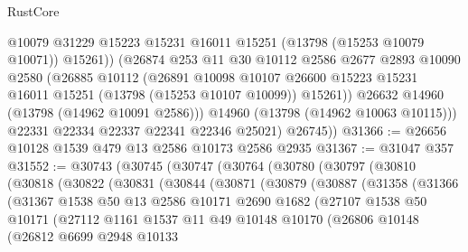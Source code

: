 \begin{lexlean}{RustCore}
\begin{coremodule}
                @10079
                @31229
                @15223
                @15231
                @16011
                @15251
                (@13798 (@15253 @10079 @10071))
                @15261))
            (@26874
              @253
              @11
              @30
              @10112
              @2586
              @2677
              @2893
              @10090
              @2580
              (@26885
                @10112
                (@26891
                  @10098
                  @10107
                  @26600
                  @15223
                  @15231
                  @16011
                  @15251
                  (@13798 (@15253 @10107 @10099))
                  @15261))
              @26632
              @14960
              (@13798 (@14962 @10091 @2586)))
            @14960
            (@13798 (@14962 @10063 @10115)))
          @22331
          @22334
          @22337
          @22341
          @22346
          @25021)
        @26745))
@31366 := @26656 @10128 @1539 @479 @13 @2586 @10173 @2586 @2935
@31367 := @31047 @357
@31552 := @30743
    (@30745
      (@30747
        (@30764
          (@30780
            (@30797
              (@30810
                (@30818
                  (@30822
                    (@30831
                      (@30844
                        (@30871
                          (@30879
                            (@30887
                              (@31358
                                (@31366
                                  (@31367
                                    @1538
                                    @50
                                    @13
                                    @2586
                                    @10171
                                    @2690
                                    @1682
                                    (@27107
                                      @1538
                                      @50
                                      @10171
                                      (@27112
                                        @1161
                                        @1537
                                        @11
                                        @49
                                        @10148
                                        @10170
                                        (@26806
                                          @10148
                                          (@26812
                                            @6699
                                            @2948
                                            @10133

\end{coremodule}
\end{lexlean}
